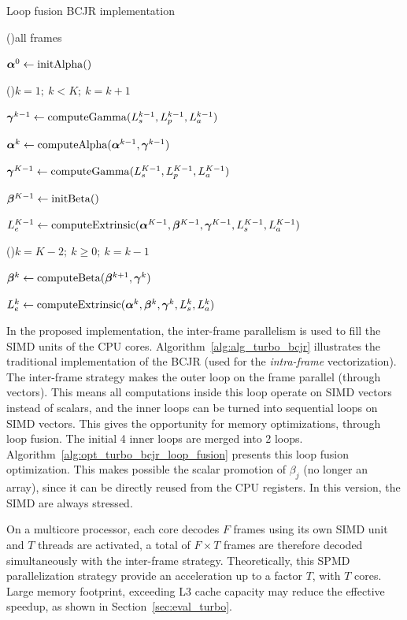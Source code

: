 \begin{algorithm}
  \caption{Loop fusion BCJR implementation}
  \label{alg:opt_turbo_bcjr_loop_fusion}

  \For(){all frames}
  {
    $\boldsymbol{\alpha}^0\gets \operatorname*{initAlpha}()$

    \For(){$k=1;~k<K;~k=k+1$}
    {
      $\boldsymbol{\gamma}^{k-1}\gets \operatorname*{computeGamma}(L_{s}^{k-1}, L_{p}^{k-1}, L_{a}^{k-1})$

      $\boldsymbol{\alpha}^k\gets \operatorname*{computeAlpha}(\boldsymbol{\alpha}^{k-1}, \boldsymbol{\gamma}^{k-1})$
    }

    $\boldsymbol{\gamma}^{K-1}\gets \operatorname*{computeGamma}(L_{s}^{K-1}, L_{p}^{K-1}, L_{a}^{K-1})$

    $\boldsymbol{\beta}^{K-1}\gets \operatorname*{initBeta}()$

    $L_e^{K-1}\gets \operatorname*{computeExtrinsic}(\boldsymbol{\alpha}^{K-1}, \boldsymbol{\beta}^{K-1}, \boldsymbol{\gamma}^{K-1}, L_{s}^{K-1}, L_{a}^{K-1})$

    \For(){$k=K-2;~k \geq 0;~k=k-1$}
    {
      $\boldsymbol{\beta}^k\gets \operatorname*{computeBeta}(\boldsymbol{\beta}^{k+1}, \boldsymbol{\gamma}^{k})$

      $L_e^{k}\gets \operatorname*{computeExtrinsic}(\boldsymbol{\alpha}^{k}, \boldsymbol{\beta}^k, \boldsymbol{\gamma}^{k}, L_{s}^{k}, L_{a}^{k})$
    }
  }
\end{algorithm}

In the proposed implementation, the inter-frame parallelism is used to fill the
SIMD units of the CPU cores. Algorithm~\ref{alg:alg_turbo_bcjr} illustrates the
traditional implementation of the BCJR (used for the \emph{intra-frame}
vectorization). The inter-frame strategy makes the outer loop on the frame
parallel (through vectors). This means all computations inside this loop operate
on SIMD vectors instead of scalars, and the inner loops can be turned into
sequential loops on SIMD vectors. This gives the opportunity for memory
optimizations, through loop fusion. The initial 4 inner loops are merged into 2
loops. Algorithm~\ref{alg:opt_turbo_bcjr_loop_fusion} presents this loop fusion
optimization. This makes possible the scalar promotion of $\beta_j$ (no longer
an array), since it can be directly reused from the CPU registers. In this
version, the SIMD are always stressed.

On a multicore processor, each core decodes $F$ frames using its own SIMD unit
and $T$ threads are activated, a total of $F\times T$ frames are therefore
decoded simultaneously with the inter-frame strategy. Theoretically, this SPMD
parallelization strategy provide an acceleration up to a factor $T$, with $T$
cores. Large memory footprint, exceeding L3 cache capacity may reduce the
effective speedup, as shown in Section~\ref{sec:eval_turbo}.

